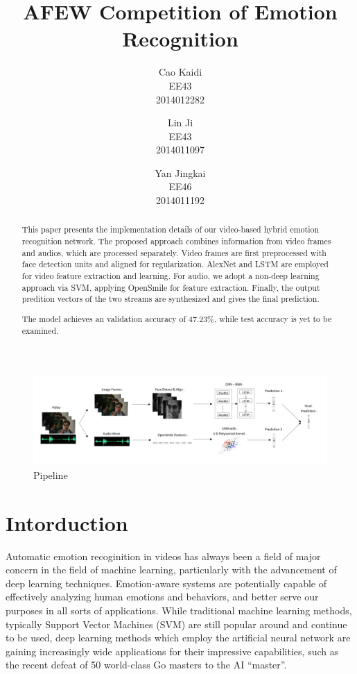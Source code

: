 \documentclass[10pt,twocolumn,letterpaper]{article}
\begin{document}
\title{AFEW Competition of Emotion Recognition}

\author{Cao Kaidi\\
EE43\\
2014012282
\and
Lin Ji\\
EE43\\
2014011097
\and
Yan Jingkai\\
EE46\\
2014011192
}

\maketitle

\begin{abstract}
   This paper presents the implementation details of our video-based hybrid emotion recognition network. The proposed approach combines information from video frames and audios, which are processed separately. Video frames are first preprocessed with face detection units and aligned for regularization. AlexNet and LSTM are employed for video feature extraction and learning. For audio, we adopt a non-deep learning approach via SVM, applying OpenSmile for feature extraction. Finally, the output predition vectors of the two streams are synthesized and gives the final prediction.

   The model achieves an validation accuracy of $47.23\%$, while test accuracy is yet to be examined.
\end{abstract}


\begin{figure}[htpb]
	\centering
	\includegraphics[width = \textwidth]{pic/pipeline.png}
	\caption{Pipeline}
\end{figure}

\section{Intorduction}

Automatic emotion recoginition in videos has always been a field of major concern in the field of machine learning, particularly with the advancement of deep learning techniques. Emotion-aware systems are potentially capable of effectively analyzing human emotions and behaviors, and better serve our purposes in all sorts of applications.
While traditional machine learning methods, typically Support Vector Machines (SVM) are still popular around and continue to be used, deep learning methods which employ the artificial neural network are gaining increasingly wide applications for their impressive capabilities, such as the recent defeat of 50 world-class Go masters to the AI ``master''.
\end{document}
